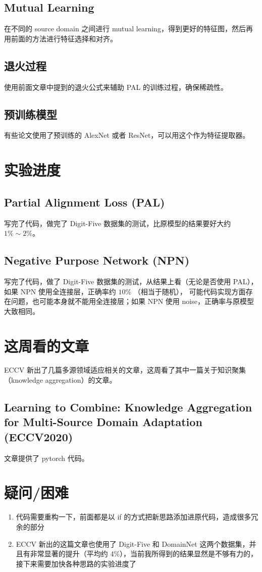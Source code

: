 \documentclass[UTF8]{ctexart}
\begin{document}
\subsection{Mutual Learning}

在不同的 source domain 之间进行 mutual learning，得到更好的特征图，然后再用前面的方法进行特征选择和对齐。

\subsection{退火过程}

使用前面文章中提到的退火公式来辅助 PAL 的训练过程，确保稀疏性。

\subsection{预训练模型}

有些论文使用了预训练的 AlexNet 或者 ResNet，可以用这个作为特征提取器。

\section{实验进度}

\subsection{Partial Alignment Loss (PAL)}

写完了代码，做完了 Digit-Five 数据集的测试，比原模型的结果要好大约 $1\% \sim 2\%$。

\subsection{Negative Purpose Network (NPN)}

写完了代码，做了 Digit-Five 数据集的测试，从结果上看（无论是否使用 PAL），如果 NPN 使用全连接层，正确率约 $10\%$ （相当于随机），
可能代码实现方面存在问题，也可能本身就不能用全连接层；如果 NPN 使用 noise，正确率与原模型大致相同。

\section{这周看的文章}

ECCV 新出了几篇多源领域适应相关的文章，这周看了其中一篇关于知识聚集（knowledge aggregation）的文章。

\subsection{Learning to Combine: Knowledge Aggregation for Multi-Source Domain Adaptation (ECCV2020)}

文章提供了 pytorch 代码。

\section{疑问/困难}

\begin{enumerate}
    \item 代码需要重构一下，前面都是以 if 的方式把新思路添加进原代码，造成很多冗余的部分
    \item ECCV 新出的这篇文章也使用了 Digit-Five 和 DomainNet 这两个数据集，并且有非常显著的提升（平均约 4\%），当前我所得到的结果显然是不够有力的，接下来需要加快各种思路的实验进度了
\end{enumerate}
\end{document}
